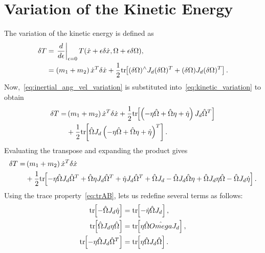 \section{Variation of the Kinetic Energy}\label{sec:inertial_kinetic_energy_variation}
The variation of the kinetic energy is defined as
\begin{align}
    \delta T &= \left. \frac{d }{d \epsilon}\right|_{\epsilon=0} T(\dot{x} + \epsilon \delta \dot{x}, \Omega + \epsilon \delta \Omega), \nonumber\\
             &=   \left( m_1 + m_2 \right) \dot{x}^T \delta \dot{x} + \frac{1}{2} \mathrm{tr}\negthickspace\left[  (\delta \Omega )^\wedge J_d (\delta \Omega )^T + (\delta \Omega)J_d (\delta \Omega)^T \right]\label{eq:kinetic_variation}.
\end{align}
Now,~\cref{eq:inertial_ang_vel_variation} is substituted into~\cref{eq:kinetic_variation} to obtain
\begin{align*}
    \delta T =&  \left( m_1 + m_2 \right) \dot{x}^T \delta \dot{x} + \frac{1}{2} \mathrm{tr}\negthickspace\left[ \left( -\eta \hat{\Omega} + \hat{\Omega} \eta + \dot{\eta} \right) J_d \hat{\Omega}^T \right] \nonumber \\
              &+ \frac{1}{2} \mathrm{tr}\negthickspace\left[ \hat{\Omega} J_d \left( -\eta \hat{\Omega} + \hat{\Omega} \eta + \dot{\eta} \right)^T \right] .
\end{align*}
Evaluating the transpose and expanding the product gives
\begin{align*}
    \delta T =&  \left( m_1 + m_2 \right) \dot{x}^T \delta \dot{x} \\
              &+ \frac{1}{2} \mathrm{tr}\negthickspace\left[  -\eta \hat{\Omega} J_d \hat{\Omega}^T + \hat{\Omega} \eta J_d \hat{\Omega}^T + \dot{\eta} J_d \hat{\Omega}^T + \hat{\Omega} J_d -\hat{\Omega} J_d \hat{\Omega} \eta + \hat{\Omega} J_d \eta \hat{\Omega} - \hat{\Omega} J_d \dot{\eta} \right].
\end{align*}
Using the trace property~\cref{eq:trAB}, lets us redefine several terms as follows:
\begin{subequations}\label{eq:inertial_kinetic_energy_substitutions}
\begin{align}
    \mathrm{tr}\negthickspace\left[ -\hat{\Omega} J_d \dot{\eta} \right] &= \mathrm{tr}\negthickspace\left[ - \dot{\eta} \hat{\Omega} J_d \right] , \\
    \mathrm{tr}\negthickspace\left[ \hat{\Omega} J_d \eta \hat{\Omega} \right] &= \mathrm{tr}\negthickspace\left[ \eta \hat{\Omega} \hat{Omega} J_d \right] , \\
    \mathrm{tr}\negthickspace\left[ -\eta \hat{\Omega} J_d \hat{\Omega}^T \right] &= \mathrm{tr}\negthickspace\left[ \eta \hat{\Omega} J_d \hat{\Omega} \right] .
\end{align}
\end{subequations}     
